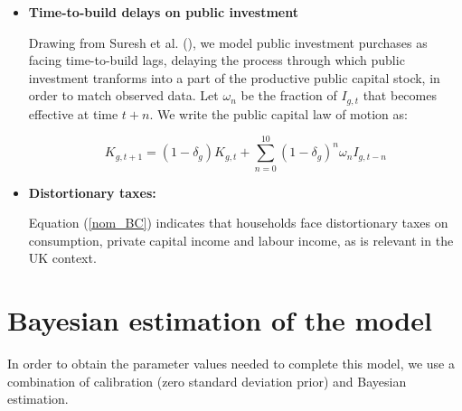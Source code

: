 \documentclass[titlepage, 11pt, a4paper]{article}
\renewcommand{\&}{and}
\begin{document}
\begin{itemize}
    The equations above indicate that the existing stock of private capital can be worked more intensively (via an increase in $U_{k,t}$), but at the cost of accelerated depreciation, where $\phi$ governs the magnitude of that cost. Here, $\delta_p$ represents the baseline rate of physical depreciation and $\delta_{pt} = \delta_{p}U_{k,t}^\phi$ is the effective depreciation rate. When capital is utilised more intensively, the existing stock depreciates more quickly as $\phi > 0$. The product $U_{k,t}K_{p,t} = \tilde{K_{p,t}}$ represents the flow of private capital services. This means that private capital services can adjust immediately in response to a shock, without the firm having to wait one period for investment to roll over into capital stock. Subsequently, it is private capital services which enters as a factor of production in the aggregate production function in equation (\ref{agg_prod_fn}).

    \item \textbf{Time-to-build delays on public investment} \par
    Drawing from Suresh et al. (\citeyear{Suresh24}), we model public investment purchases as facing time-to-build lags, delaying the process through which public investment tranforms into a part of the productive public capital stock, in order to match observed data. Let $\omega_n$ be the fraction of $I_{g,t}$ that becomes effective at time $t+n$. We write the public capital law of motion as: 

\begin{equation}
    \label{public_LOM}
    K_{g,t+1} = (1-\delta_g)K_{g,t} + \sum_{n=0}^{10}(1-\delta_g)^n \omega_n I_{g,t-n}
\end{equation}


    \item \textbf{Distortionary taxes:} \par 
    Equation (\ref{nom_BC}) indicates that households face distortionary taxes on consumption, private capital income and labour income, as is relevant in the UK context. 

    
\end{itemize}



\section{Bayesian estimation of the model} \label{estimation}
In order to obtain the parameter values needed to complete this model, we use a combination of calibration (zero standard deviation prior) and Bayesian estimation. 
\end{document}
